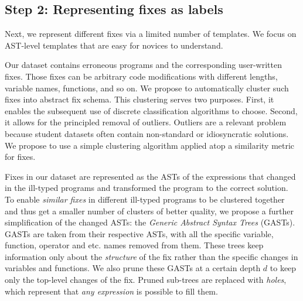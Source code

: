 \subsection{Step 2: Representing fixes as labels}
\label{subsec:step2}

Next, we represent different fixes via a limited number of templates. We focus
on AST-level templates that are easy for novices to understand.

 Our dataset contains erroneous programs and the
corresponding user-written fixes. Those fixes can be arbitrary code
modifications with different lengths, variable names, functions, and so on. We
propose to automatically cluster such fixes into abstract fix schema. This
clustering serves two purposes. First, it enables the subsequent use of discrete
classification algorithms to choose. Second, it allows for the principled
removal of outliers. Outliers are a relevant problem because student datasets
often contain non-standard or idiosyncratic solutions. We propose to use a
simple clustering algorithm applied atop a similarity metric for fixes.
%

Fixes in our dataset are represented as the ASTs of the expressions that changed
in the ill-typed programs and transformed the program to the correct solution.
To enable \emph{similar fixes} in different ill-typed programs to be clustered
together and thus get a smaller number of clusters of better quality, we propose
a further simplification of the changed ASTs: the \emph{Generic Abstract Syntax
Trees} (GASTs). GASTs are taken from their respective ASTs, with all the
specific variable, function, operator and etc. names removed from them. These
trees keep information only about the \emph{structure} of the fix rather than
the specific changes in variables and functions. We also prune these GASTs at a
certain depth $d$ to keep only the top-level changes of the fix. Pruned
sub-trees are replaced with \emph{holes}, which represent that \emph{any
expression} is possible to fill them.


